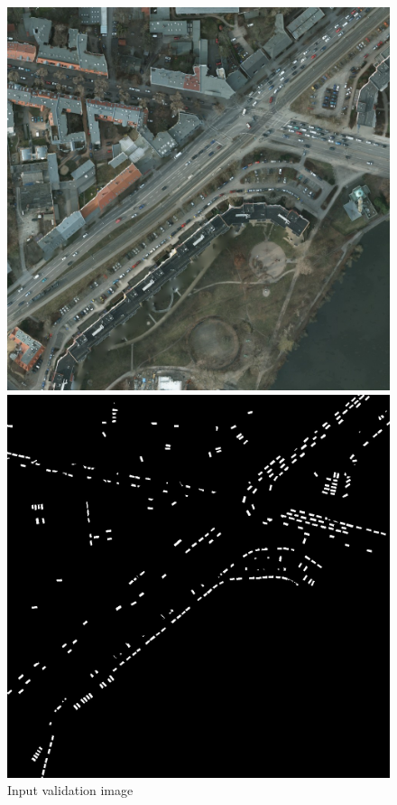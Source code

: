 \documentclass[a4paper,11pt]{article}
\begin{document}
\begin{figure}[H]
  \includegraphics[width=\linewidth]{gan_vs_class/img_4}
  \caption{Input validation image}\label{fig:label_1}
\endminipage\hfill
{}
  \includegraphics[width=\linewidth]{gan_vs_class/label_4}

\end{figure}
\end{document}
